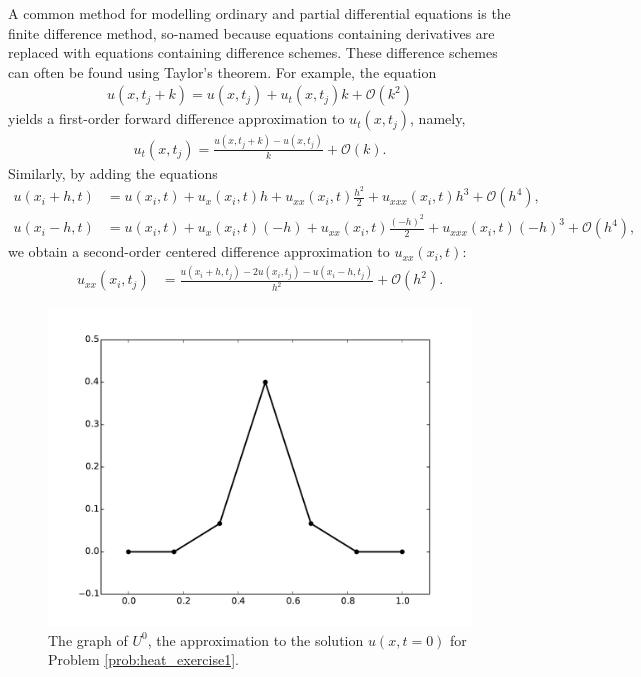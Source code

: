 A common method for modelling ordinary and partial differential equations is the finite difference method, so-named because equations containing derivatives are replaced with equations containing difference schemes.
These difference schemes can often be found using Taylor's theorem.
For example, the equation 
\begin{align*}
	u(x,t_j + k) = u(x,t_j) + u_t(x,t_j)k + \mathcal{O}(k^2)
\end{align*}
yields a first-order forward difference approximation to $u_t(x,t_j)$, namely, 
\begin{align*}
	u_t(x,t_j ) = \frac{u(x,t_j+k) - u(x,t_j)}{k} + \mathcal{O}(k).
\end{align*}
Similarly, by adding the equations 
\begin{align*}
	u(x_i+h,t) &= u(x_i,t) + u_x(x_i,t)h + u_{xx}(x_i,t)\frac{h^2}{2} + u_{xxx}(x_i,t)h^3 + \mathcal{O}(h^4),\\
	u(x_i-h,t) &= u(x_i,t) + u_x(x_i,t)(-h) + u_{xx}(x_i,t)\frac{(-h)^2}{2} + u_{xxx}(x_i,t)(-h)^3 + \mathcal{O}(h^4),
\end{align*}
we obtain a second-order centered difference approximation to $u_{xx}(x_i,t)$:
\begin{align*}
	u_{xx}(x_i,t_j) &= \frac{u(x_i + h,t_j )-2 u(x_i,t_j)- u(x_i - h,t_j)}{h^2} + \mathcal{O}(h^2).
\end{align*}

\begin{figure}
\centering
\includegraphics[width=\textwidth]{heatexercise1a.pdf}
\caption{The graph of $U^{0}$, the approximation to the solution $u(x,t=0)$ for Problem \ref{prob:heat_exercise1}.}
\label{fig:heatexercise1a}
\end{figure}

